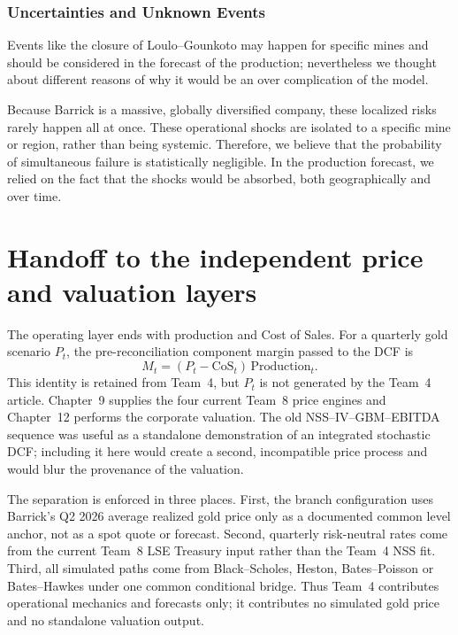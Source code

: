 

\subsubsection{Uncertainties and Unknown Events}
Events like the closure of Loulo--Gounkoto may happen for specific mines and should be considered in the forecast of the production; nevertheless we thought about different reasons of why it would be an over complication of the model. 

Because Barrick is a massive, globally diversified company, these localized risks rarely happen all at once. These operational shocks are isolated to a specific mine or region, rather than being systemic. Therefore, we believe that the probability of simultaneous failure is statistically negligible. In the production forecast, we relied on the fact that the shocks would be absorbed, both geographically and over time.


\section{Handoff to the independent price and valuation layers}

The operating layer ends with production and Cost of Sales. For a quarterly
gold scenario \(P_t\), the pre-reconciliation component margin passed to the
DCF is
\[
    M_t=(P_t-\mathrm{CoS}_t)\,\mathrm{Production}_t .
\]
This identity is retained from Team~4, but \(P_t\) is not generated by the
Team~4 article. Chapter~9 supplies the four current Team~8 price engines and
Chapter~12 performs the corporate valuation. The old NSS--IV--GBM--EBITDA
sequence was useful as a standalone demonstration of an integrated stochastic
DCF; including it here would create a second, incompatible price process and
would blur the provenance of the valuation.

The separation is enforced in three places. First, the branch configuration
uses Barrick's Q2 2026 average realized gold price only as a documented common
level anchor, not as a spot quote or forecast. Second, quarterly risk-neutral
rates come from the current Team~8 LSE Treasury input rather than the Team~4
NSS fit. Third, all simulated paths come from Black--Scholes, Heston,
Bates--Poisson or Bates--Hawkes under one common conditional bridge. Thus
Team~4 contributes operational mechanics and forecasts only; it contributes
no simulated gold price and no standalone valuation output.

